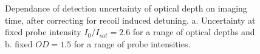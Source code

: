 \documentclass[12pt]{iopart}
\begin{document}
\begin{figure}
\caption{Dependance of detection uncertainty of optical depth on imaging time, after correcting for recoil induced detuning. a. Uncertainty at fixed probe intensity $I_0/I_{sat}=2.6$ for a range of optical depths and b. fixed $OD=1.5$ for a range of probe intensities.}  
\label{fig:SNR}
\end{figure}
\end{document}
